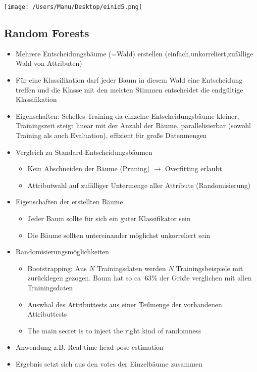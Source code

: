 \documentclass[paper=a4, fontsize=11pt]{scrartcl} %
\numberwithin{equation}{section} %
\numberwithin{figure}{section} %
\numberwithin{table}{section} %
\begin{document}
\texttt{[image: /Users/Manu/Desktop/einid5.png]}

\subsection{Random Forests}

\begin{itemize}
\item Mehrere Entscheidungsbäume (=Wald) erstellen (einfach,unkorreliert,zufällige Wahl von Attributen)
\item Für eine Klassifikation darf jeder Baum in diesem Wald eine Entscheidung treffen und die Klasse mit den meisten Stimmen entscheidet die endgültige Klassifikation
\item Eigenschaften: Schelles Training da einzelne Entscheidungsbäume kleiner, Trainingszeit steigt linear mit der Anzahl der Bäume, parallelisierbar (sowohl Training als auch Evaluation), effizient für große Datenmengen
\item Vergleich zu Standard-Entscheidungsbäumen
\begin{itemize}
\item Kein Abschneiden der Bäume (Pruning) $\rightarrow$ Overfitting erlaubt
\item Attributwahl auf zufälliger Untermenge aller Attribute (Randomisierung)
\end{itemize}
\item Eigenschaften der erstellten Bäume
\begin{itemize}
\item Jeder Baum sollte für sich ein guter Klassifikator sein
\item Die Bäume sollten untereinander möglichst unkorreliert sein
\end{itemize}
\item Randomisierungsmöglichkeiten
\begin{itemize}
\item Bootstrapping: Aus $N$ Trainingsdaten werden $N$ Trainingsbeispiele mit zurücklegen gezogen. Baum hat so ca $~63\%$ der Größe verglichen mit allen Trainingsdaten
\item Auswhal des Attributtests aus einer Teilmenge der vorhandenen Attributtests
\item The main secret is to inject the \glqq right kind of randomness\grqq
\end{itemize}
\item Anwendung z.B. Real time head pose estimation
\item Ergebnis setzt sich aus den votes der Einzelbäume zusammen
\end{itemize}
\end{document}
